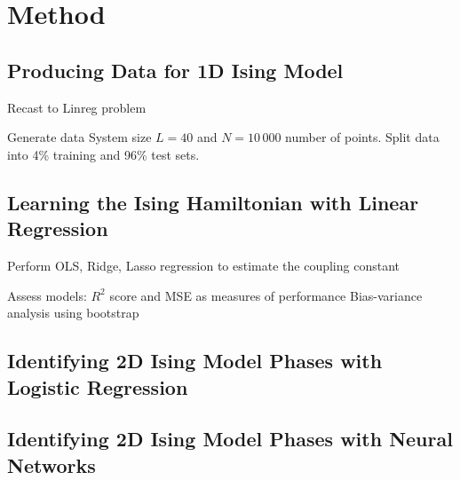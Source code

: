 \section{Method}\label{sec:Method}

\subsection{Producing Data for 1D Ising Model}\label{sec:method datagen}

Recast to Linreg problem 

Generate data
System size $L=40$ and $N=10\,000$ number of points. 
Split data into 4\% training and 96\% test sets.

\subsection{Learning the Ising Hamiltonian with Linear Regression}\label{sec:method linreg}
Perform OLS, Ridge, Lasso regression to estimate the coupling constant

Assess models: 
$R^2$ score and MSE as measures of performance
Bias-variance analysis using bootstrap

\subsection{Identifying 2D Ising Model Phases with Logistic Regression}\label{sec:method logreg}

\subsection{Identifying 2D Ising Model Phases with Neural Networks}\label{sec:method NN}

